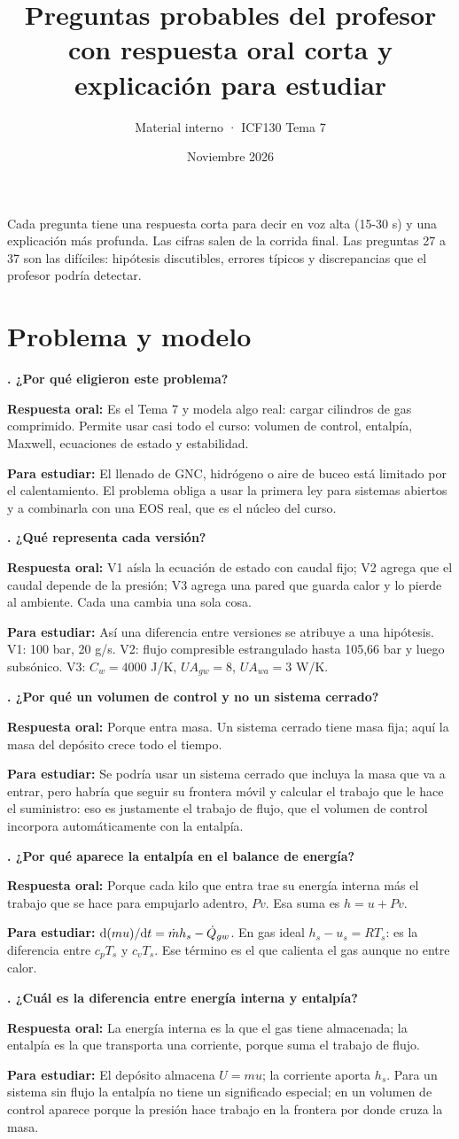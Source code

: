 \documentclass[11pt]{article}
\title{\color{tinta}\textbf{Preguntas probables del profesor}\\[4pt]\large con respuesta oral corta y explicación para estudiar}
\author{Material interno · ICF130 Tema 7}
\date{Noviembre 2026}
\newcounter{preg}
\newcommand{\pregunta}[3]{\stepcounter{preg}%
\begin{tcolorbox}[colback=white,colframe=tinta!25,boxrule=0.5pt,sharp corners,left=6pt,right=6pt,top=4pt,bottom=4pt,breakable]
\textbf{\color{tinta}\thepreg. #1}\par\smallskip
\textbf{Respuesta oral:} #2\par\smallskip
{\color{gris}\small\textbf{Para estudiar:} #3}
\end{tcolorbox}}
\begin{document}
\maketitle
Cada pregunta tiene una respuesta corta para decir en voz alta (15-30 s) y una explicación más profunda.
Las cifras salen de la corrida final. Las preguntas 27 a 37 son las difíciles: hipótesis discutibles,
errores típicos y discrepancias que el profesor podría detectar.

\section{Problema y modelo}
\pregunta{¿Por qué eligieron este problema?}
{Es el Tema 7 y modela algo real: cargar cilindros de gas comprimido. Permite usar casi todo el curso:
volumen de control, entalpía, Maxwell, ecuaciones de estado y estabilidad.}
{El llenado de GNC, hidrógeno o aire de buceo está limitado por el calentamiento. El problema obliga a
usar la primera ley para sistemas abiertos y a combinarla con una EOS real, que es el núcleo del curso.}

\pregunta{¿Qué representa cada versión?}
{V1 aísla la ecuación de estado con caudal fijo; V2 agrega que el caudal depende de la presión; V3
agrega una pared que guarda calor y lo pierde al ambiente. Cada una cambia una sola cosa.}
{Así una diferencia entre versiones se atribuye a una hipótesis. V1: 100 bar, 20 g/s. V2: flujo compresible
estrangulado hasta 105,66 bar y luego subsónico. V3: $C_w=4000$ J/K, $UA_{gw}=8$, $UA_{wa}=3$ W/K.}

\pregunta{¿Por qué un volumen de control y no un sistema cerrado?}
{Porque entra masa. Un sistema cerrado tiene masa fija; aquí la masa del depósito crece todo el tiempo.}
{Se podría usar un sistema cerrado que incluya la masa que va a entrar, pero habría que seguir su frontera
móvil y calcular el trabajo que le hace el suministro: eso es justamente el trabajo de flujo, que el volumen
de control incorpora automáticamente con la entalpía.}

\pregunta{¿Por qué aparece la entalpía en el balance de energía?}
{Porque cada kilo que entra trae su energía interna más el trabajo que se hace para empujarlo adentro, $Pv$.
Esa suma es $h=u+Pv$.}
{$\mathrm{d}(mu)/\mathrm{d} t=\dot m h_s-\dot Q_{gw}$. En gas ideal $h_s-u_s=RT_s$: es la diferencia entre $c_pT_s$ y $c_vT_s$.
Ese término es el que calienta el gas aunque no entre calor.}

\pregunta{¿Cuál es la diferencia entre energía interna y entalpía?}
{La energía interna es la que el gas tiene almacenada; la entalpía es la que transporta una corriente,
porque suma el trabajo de flujo.}
{El depósito almacena $U=mu$; la corriente aporta $h_s$. Para un sistema sin flujo la entalpía no tiene un
significado especial; en un volumen de control aparece porque la presión hace trabajo en la frontera por donde cruza la masa.}
\end{document}
